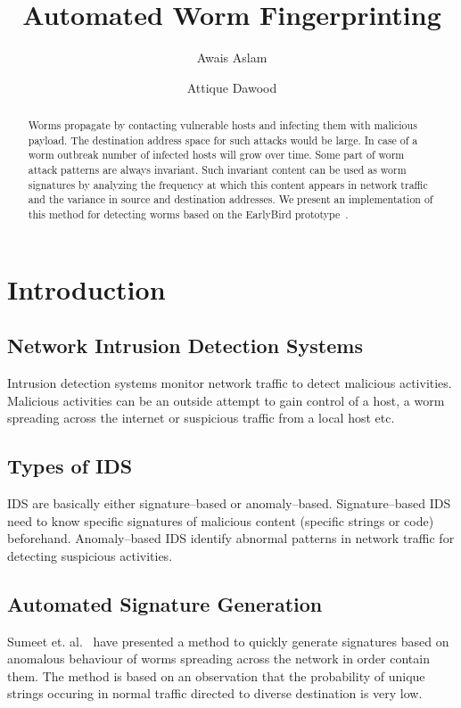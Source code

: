 \documentclass{report}
\begin{document}
\title{Automated Worm Fingerprinting}
\author{Awais Aslam \and Attique Dawood}
\maketitle

\begin{abstract}
Worms propagate by contacting vulnerable hosts and infecting them with malicious payload.
The destination address space for such attacks would be large. In case of a worm outbreak
number of infected hosts will grow over time. Some part of worm attack patterns are always
invariant. Such invariant content can be used as worm signatures by analyzing the frequency
at which this content appears in network traffic and the variance in source and destination
addresses. We present an implementation of this method for detecting worms based on the
EarlyBird prototype~\cite{DBLP:conf/osdi/SinghEVS04}.
\end{abstract}

\chapter{Introduction}
\section{Network Intrusion Detection Systems}

Intrusion detection systems monitor network traffic to detect malicious activities. Malicious activities can be an outside attempt to gain control of a host, a worm spreading across the internet or suspicious traffic from a local host etc.

\section{Types of IDS}

IDS are basically either signature--based or anomaly--based. Signature--based IDS need to know specific signatures of malicious content (specific strings or code) beforehand. Anomaly--based IDS identify abnormal patterns in network traffic for detecting suspicious activities.

\section{Automated Signature Generation}

Sumeet et. al.~\cite{DBLP:conf/osdi/SinghEVS04} have presented a method to quickly generate signatures based on anomalous behaviour of worms spreading across the network in order contain them. The method is based on an observation that the probability of unique strings occuring in normal traffic directed to diverse destination is very low.
\end{document}
